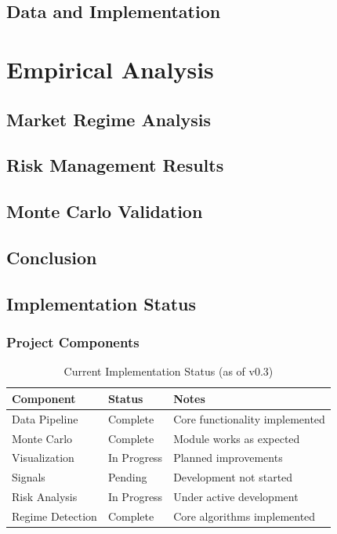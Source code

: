 \documentclass[a4paper, 12pt, oneside]{Thesis}
\begin{document}
\chapter{Data and Implementation}
\label{ch:data}


\part{Empirical Analysis}

\chapter{Market Regime Analysis}
\label{ch:regime}


\chapter{Risk Management Results}
\label{ch:results}


\chapter{Monte Carlo Validation}
\label{ch:validation}



\chapter{Conclusion}
\label{ch:conclusion}


\chapter{Implementation Status}
\label{ch:status}

\section{Project Components}
\begin{table}[h]
\begin{tabular}{lll}
\hline
Component & Status & Notes \\
\hline
Data Pipeline & Complete & Core functionality implemented \\
Monte Carlo & Complete & Module works as expected \\
Visualization & In Progress & Planned improvements \\
Signals & Pending & Development not started \\
Risk Analysis & In Progress & Under active development \\
Regime Detection & Complete & Core algorithms implemented \\
\hline
\end{tabular}
\caption{Current Implementation Status (as of v0.3)}
\label{tab:status}
\end{table}
\end{document}
